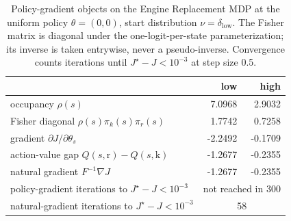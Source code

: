 \begin{table}[h]
\centering
\caption{Policy-gradient objects on the Engine Replacement MDP at the uniform policy $\theta = (0, 0)$, start distribution $\nu = \delta_{\text{low}}$. The Fisher matrix is diagonal under the one-logit-per-state parameterization; its inverse is taken entrywise, never a pseudo-inverse. Convergence counts iterations until $J^\star - J < 10^{-3}$ at step size 0.5.}
\label{tab:engine_policy_square}
\begin{tabular}{lrr}
\hline
 & low & high \\
\hline
occupancy $\rho(s)$ & 7.0968 & 2.9032 \\
Fisher diagonal $\rho(s)\pi_k(s)\pi_r(s)$ & 1.7742 & 0.7258 \\
gradient $\partial J / \partial \theta_s$ & -2.2492 & -0.1709 \\
action-value gap $Q(s, \text{r}) - Q(s, \text{k})$ & -1.2677 & -0.2355 \\
natural gradient $F^{-1} \nabla J$ & -1.2677 & -0.2355 \\
policy-gradient iterations to $J^\star-J<10^{-3}$ & \multicolumn{2}{c}{not reached in 300} \\
natural-gradient iterations to $J^\star-J<10^{-3}$ & \multicolumn{2}{c}{58} \\
\hline
\end{tabular}
\end{table}
